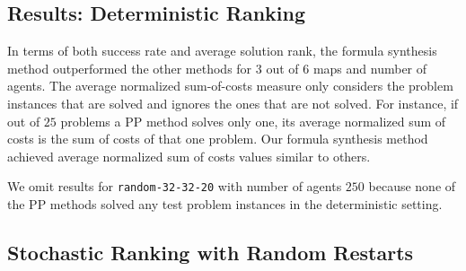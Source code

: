 \subsection{Results: Deterministic Ranking}
\label{sec:detRankings}

In terms of both success rate and average solution rank, the formula synthesis method outperformed the other methods for $ 3 $ out of $ 6 $ maps and number of agents. The average normalized sum-of-costs measure only considers the problem instances that are solved and ignores the ones that are not solved. For instance, if out of $ 25 $ problems a PP method solves only one, its average normalized sum of costs is the sum of costs of that one problem. Our formula synthesis method achieved average normalized sum of costs values similar to others.

We omit results for {\tt random-32-32-20} with number of agents $ 250 $ because none of the PP methods solved any test problem instances in the deterministic setting.


\subsection{Stochastic Ranking with Random Restarts}
\label{sec:stoRankings}

